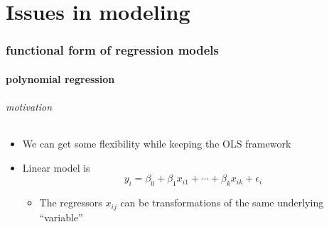 

\part*{Issues in modeling}%

\section{functional form of regression models}
\subsection{polynomial regression}

\paragraph{motivation}

\begin{itemize}
\item We can get some flexibility while keeping the OLS framework
\item Linear model is
        \[y_i = \beta_0 + \beta_1 x_{i1} + \cdots + \beta_k x_{ik} +
        \epsilon_i\]
\begin{itemize}
\item The regressors $x_{ij}$ can be transformations of the same
          underlying ``variable''
\end{itemize}
\end{itemize}

